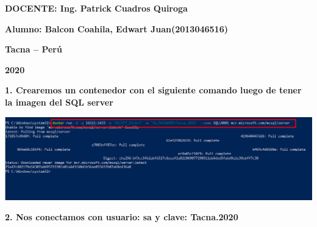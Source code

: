 \documentclass{article}
\begin{document}
\begin{titlepage}
\begin{center}
\vspace*{0.3in}
\begin{Large}
\textbf{DOCENTE: Ing. Patrick Cuadros Quiroga} \\
\end{Large}

\vspace*{0.2in}
\vspace*{0.1in}
\begin{large}

\begin{Large}
\textbf{Alumno: Balcon Coahila, Edwart Juan\hfill	(2013046516) } \\
\end{Large}

\vspace*{0.15in}
\begin{Large}
\textbf{Tacna – Perú} \\
\end{Large}

\vspace*{0.05in}
\begin{Large}
\textbf{2020 } \\
\end{Large}

\end{large}
\end{center}

\end{titlepage}


\newpage


\textbf{1. Crearemos un contenedor con el siguiente comando luego de tener la imagen del SQL server
}

    \begin{center}
		\includegraphics[width=15cm]{./images/1} 
	\end{center}

\textbf{2. Nos conectamos con usuario: sa y clave: Tacna.2020 
}
\end{document}
